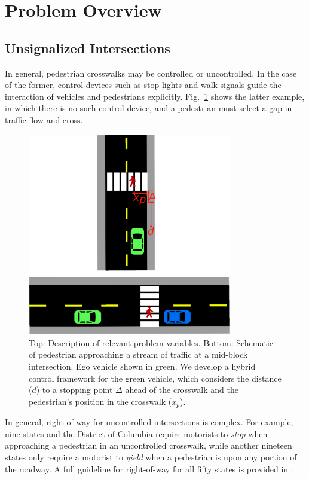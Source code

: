 \documentclass[letterpaper, 10 pt, conference]{ieeeconf}  %
\begin{document}
\section{Problem Overview}

\subsection{Unsignalized Intersections}

In general, pedestrian crosswalks may be controlled or uncontrolled. In the case of the former, control devices such as stop lights and walk signals guide the interaction of vehicles and pedestrians explicitly. Fig.~\ref{fig:schematic} shows the latter example, in which there is no such control device, and a pedestrian must select a gap in traffic flow and cross.   

\begin{figure}
\centering
\includegraphics[width=3.5in]{figures/example2.eps}
\caption{Top: Description of relevant problem variables. Bottom: Schematic of pedestrian approaching a stream of traffic at a mid-block intersection. Ego vehicle shown in green. We develop a hybrid control framework for the green vehicle, which considers the distance ($d$) to a stopping point $\Delta$ ahead of the crosswalk and the pedestrian's position in the crosswalk ($x_p$).}
\label{fig:schematic}
\end{figure}

In general, right-of-way for uncontrolled intersections is complex. For example, nine states and the District of Columbia require motorists to \textit{stop} when approaching a pedestrian in an uncontrolled crosswalk, while another nineteen states only require a motorist to \textit{yield} when a pedestrian is upon any portion of the roadway. A full guideline for right-of-way for all fifty states is provided in \cite{Legislatures2018}.
\end{document}
